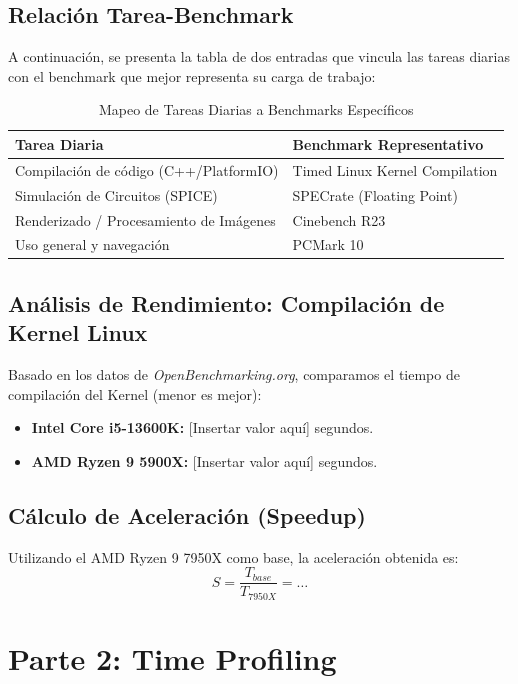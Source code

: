 \documentclass[12pt,a4paper]{article}
\begin{document}
	\subsection{Relación Tarea-Benchmark}
	A continuación, se presenta la tabla de dos entradas que vincula las tareas diarias con el benchmark que mejor representa su carga de trabajo:
	
	\begin{table}[H]
		\centering
		\caption{Mapeo de Tareas Diarias a Benchmarks Específicos}
		\begin{tabular}{@{}ll@{}}
			\toprule
			\textbf{Tarea Diaria} & \textbf{Benchmark Representativo} \\ \midrule
			Compilación de código (C++/PlatformIO) & Timed Linux Kernel Compilation \\
			Simulación de Circuitos (SPICE) & SPECrate (Floating Point) \\
			Renderizado / Procesamiento de Imágenes & Cinebench R23 \\
			Uso general y navegación & PCMark 10 \\ \bottomrule
		\end{tabular}
	\end{table}
	
	\subsection{Análisis de Rendimiento: Compilación de Kernel Linux}
	Basado en los datos de \textit{OpenBenchmarking.org}, comparamos el tiempo de compilación del Kernel (menor es mejor):
	
	\begin{itemize}
		\item \textbf{Intel Core i5-13600K:} [Insertar valor aquí] segundos.
		\item \textbf{AMD Ryzen 9 5900X:} [Insertar valor aquí] segundos.
	\end{itemize}
	
	\subsection{Cálculo de Aceleración (Speedup)}
	Utilizando el AMD Ryzen 9 7950X como base, la aceleración obtenida es:
	\begin{equation}
		S = \frac{T_{base}}{T_{7950X}} = \dots
	\end{equation}
	
	\section{Parte 2: Time Profiling}
\end{document}
